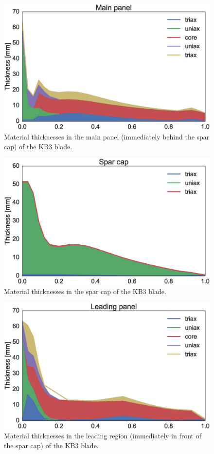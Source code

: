\begin{figure}[!ht]
\begin{center}
	\includegraphics[width=.85\linewidth]{figures/KB3_region02.eps}
\end{center}
\caption{Material thicknesses in the main panel (immediately behind the spar cap) of the KB3 blade.}
\label{fig:KB3matstackr02}
\end{figure}

\begin{figure}[!ht]
\begin{center}
	\includegraphics[width=.85\linewidth]{figures/KB3_region04.eps}
\end{center}
\caption{Material thicknesses in the spar cap of the KB3 blade.}
\label{fig:KB3matstackr04}
\end{figure}

\begin{figure}[!ht]
\begin{center}
	\includegraphics[width=.85\linewidth]{figures/KB3_region06.eps}
\end{center}
\caption{Material thicknesses in the leading region (immediately in front of the spar cap) of the KB3 blade.}
\label{fig:KB3matstackr06}
\end{figure}

